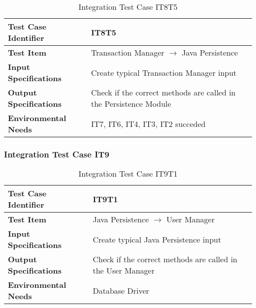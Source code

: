 \vspace{10pt}
\begin{table}[htbp]
\begin{center}
\renewcommand{\arraystretch}{1.5}
\begin{tabular}{l|p{}}
\hline
\textbf{Test Case Identifier} & IT8T5\\
\hline
\textbf{Test Item} & Transaction Manager $\rightarrow$ Java Persistence\\
\hline
\textbf{Input Specifications} & Create typical Transaction Manager input \\
\hline
\textbf{Output Specifications} & Check if the correct methods are called in the Persistence Module \\
\hline
\textbf{Environmental Needs} & IT7, IT6, IT4, IT3, IT2 succeded\\
\hline
\end{tabular}
\caption{Integration Test Case IT8T5}
\end{center}
\end{table}
\clearpage

\subsubsection{Integration Test Case IT9} \label{sssec:IT9}
\vspace{16pt}
\begin{table}[htbp]
\begin{center}
\renewcommand{\arraystretch}{1.5}
\begin{tabular}{l|p{}}
\hline
\textbf{Test Case Identifier} & IT9T1\\
\hline
\textbf{Test Item} & Java Persistence $\rightarrow$ User Manager\\
\hline
\textbf{Input Specifications} & Create typical Java Persistence input \\
\hline
\textbf{Output Specifications} & Check if the correct methods are called in the User Manager \\
\hline
\textbf{Environmental Needs} & Database Driver\\
\hline
\end{tabular}
\caption{Integration Test Case IT9T1}
\end{center}
\end{table}

